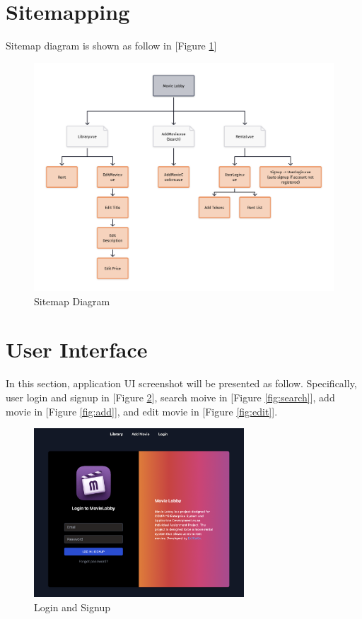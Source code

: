 \documentclass{article}
\begin{document}
\section{Sitemapping}

Sitemap diagram is shown as follow in [Figure \ref{fig:sitemap}]

\begin{figure}[!htp]
\centering
\includegraphics[width=1\textwidth]{sitemap.png}
\caption{\label{fig:sitemap}Sitemap Diagram}
\end{figure}

\section{User Interface}

In this section, application UI screenshot will be presented as follow. Specifically, user login and signup in [Figure \ref{fig:login}], search moive in [Figure \ref{fig:search}], add movie in [Figure \ref{fig:add}], and edit movie in [Figure \ref{fig:edit}].

\begin{figure}[!htp]
\centering
\includegraphics[width=0.7\textwidth]{login.png}
\caption{\label{fig:login}Login and Signup}
\end{figure}
\end{document}
